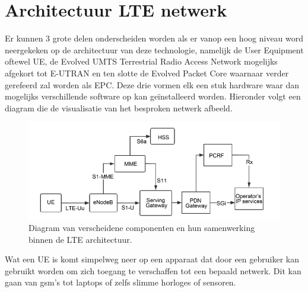 \section{Architectuur LTE netwerk}
Er kunnen 3 grote delen onderscheiden worden als er vanop een hoog niveau word neergekeken op de architectuur van deze technologie, namelijk de User Equipment oftewel UE, de Evolved UMTS Terrestrial Radio Access Network mogelijks afgekort tot E-UTRAN en ten slotte de Evolved Packet Core waarnaar verder gerefeerd zal worden als EPC. Deze drie vormen elk een stuk hardware waar dan mogelijks verschillende software op kan geïnstalleerd worden. \autocite{Richard2021} Hieronder volgt een diagram die de visualisatie van het besproken netwerk afbeeld. 
\begin{figure}[!htb]
    \includegraphics[width=1\linewidth]{graphics/LTE_architecture}
    \caption[Overzicht van de verscheidene componenten van de LTE architectuur.]{Diagram van verscheidene componenten en hun samenwerking binnen de LTE architectuur. \autocite{Yunman2021}}
    \label{fig:ltearchitecture}
\end{figure}

Wat een UE is komt simpelweg neer op een apparaat dat door een gebruiker kan gebruikt worden om zich toegang te verschaffen tot een bepaald netwerk. Dit kan gaan van gsm's tot laptops of zelfs slimme horloges of sensoren. \\


